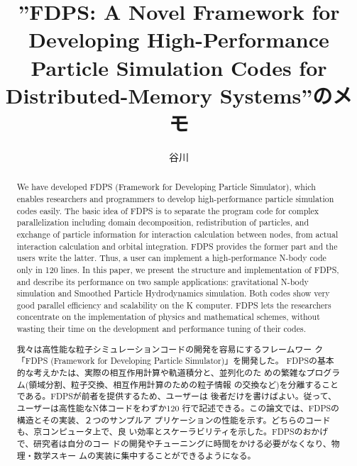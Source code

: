 \documentclass[12pt,a4paper]{jarticle}
\title{''FDPS: A Novel Framework for Developing High-Performance
  Particle Simulation Codes for Distributed-Memory Systems''のメモ}
\author{谷川} \date{}
\begin{document}
\maketitle

\begin{abstract}

  We have developed FDPS (Framework for Developing Particle
  Simulator), which enables researchers and programmers to develop
  high-performance particle simulation codes easily.  The basic idea
  of FDPS is to separate the program code for complex parallelization
  including domain decomposition, redistribution of particles, and
  exchange of particle information for interaction calculation between
  nodes, from actual interaction calculation and orbital
  integration. FDPS provides the former part and the users write the
  latter. Thus, a user can implement a high-performance N-body code
  only in 120 lines. In this paper, we present the structure and
  implementation of FDPS, and describe its performance on two sample
  applications: gravitational N-body simulation and Smoothed Particle
  Hydrodynamics simulation. Both codes show very good parallel
  efficiency and scalability on the K computer. FDPS lets the
  researchers concentrate on the implementation of physics and
  mathematical schemes, without wasting their time on the development
  and performance tuning of their codes.

  我々は高性能な粒子シミュレーションコードの開発を容易にするフレームワー
  ク「FDPS (Framework for Developing Particle Simulator)」を開発した。
  FDPSの基本的な考えかたは、実際の相互作用計算や軌道積分と、並列化のた
  めの繁雑なプログラム(領域分割、粒子交換、相互作用計算のための粒子情報
  の交換など)を分離することである。FDPSが前者を提供するため、ユーザーは
  後者だけを書けばよい。従って、ユーザーは高性能なN体コードをわずか120
  行で記述できる。この論文では、FDPSの構造とその実装、２つのサンプルア
  プリケーションの性能を示す。どちらのコードも、京コンピュータ上で、良
  い効率とスケーラビリティを示した。FDPSのおかげで、研究者は自分のコー
  ドの開発やチューニングに時間をかける必要がなくなり、物理・数学スキー
  ムの実装に集中することができるようになる。


\end{abstract}
\end{document}
